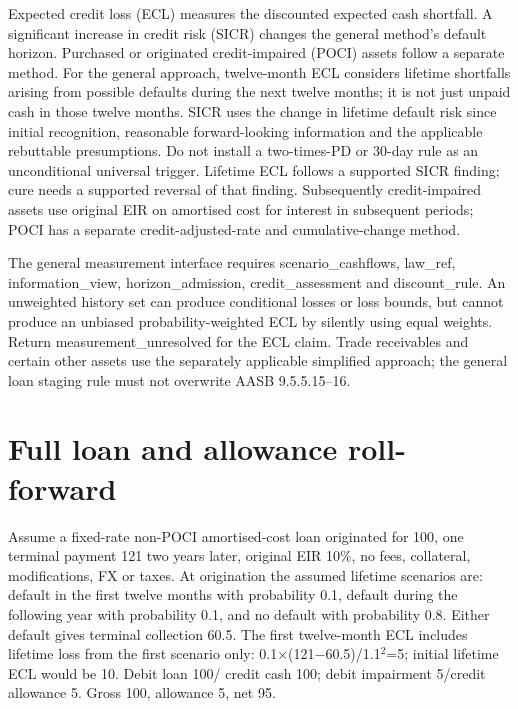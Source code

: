 Expected credit loss (ECL) measures the discounted expected cash shortfall. A significant increase in credit risk (SICR) changes the general method's default horizon. Purchased or originated credit-impaired (POCI) assets follow a separate method. For the general approach, twelve-month ECL considers lifetime shortfalls arising from possible defaults during the next twelve months; it is not just unpaid cash in those twelve months. SICR uses the change in lifetime default risk since initial recognition, reasonable forward-looking information and the applicable rebuttable presumptions. Do not install a two-times-PD or 30-day rule as an unconditional universal trigger. Lifetime ECL follows a supported SICR finding; cure needs a supported reversal of that finding. Subsequently credit-impaired assets use original EIR on amortised cost for interest in subsequent periods; POCI has a separate credit-adjusted-rate and cumulative-change method.

The general measurement interface requires scenario\_cashflows, law\_ref, information\_view, horizon\_admission, credit\_assessment and discount\_rule. An unweighted history set can produce conditional losses or loss bounds, but cannot produce an unbiased probability-weighted ECL by silently using equal weights. Return measurement\_unresolved for the ECL claim. Trade receivables and certain other assets use the separately applicable simplified approach; the general loan staging rule must not overwrite AASB 9.5.5.15--16.

\hypertarget{full-loan-and-allowance-roll-forward}{%
\section{Full loan and allowance roll-forward}\label{method-bank-methods-full-loan-and-allowance-roll-forward}}

Assume a fixed-rate non-POCI amortised-cost loan originated for 100, one terminal payment 121 two years later, original EIR 10\%, no fees, collateral, modifications, FX or taxes. At origination the assumed lifetime scenarios are: default in the first twelve months with probability 0.1, default during the following year with probability 0.1, and no default with probability 0.8. Either default gives terminal collection 60.5. The first twelve-month ECL includes lifetime loss from the first scenario only: 0.1\ensuremath{\times}(121\ensuremath{-}60.5)/1.1\ensuremath{^2}=5; initial lifetime ECL would be 10. Debit loan 100/ credit cash 100; debit impairment 5/credit allowance 5. Gross 100, allowance 5, net 95.

